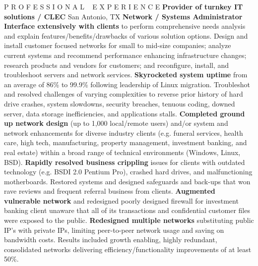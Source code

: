 \begin{rubric}{P R O F E S S I O N A L ~ E X P E R I E N C E}
		\entry*\textbf{Provider of turnkey IT solutions / CLEC} San Antonio, TX
			\textbf{Network / Systems Administrator}
		\entry*\textbf{Interface extensively with clients} to perform comprehensive needs analysis and explain features/benefits/drawbacks of various solution options.  Design and install customer focused networks for small to mid-size companies; analyze current systems and recommend performance enhancing infrastructure changes; research products and vendors for customers; and reconfigure, install, and troubleshoot servers and network services.
		\entry*\textbf{Skyrocketed system uptime} from an average of 86\% to 99.9\% following leadership of Linux migration.  Troubleshot and resolved challenges of varying complexities to reverse prior history of hard drive crashes, system slowdowns, security breaches, tenuous coding, downed server, data storage inefficiencies, and applications stalls.
		\entry*\textbf{Completed ground up network design} (up to 1,000 local/remote users) and/or system and network enhancements for diverse industry clients (e.g. funeral services, health care, high tech, manufacturing, property management, investment banking, and real estate) within a broad range of technical environments (Windows, Linux, BSD).
		\entry*\textbf{Rapidly resolved business crippling} issues for clients with outdated technology (e.g. BSDI 2.0 Pentium Pro), crashed hard drives, and malfunctioning motherboards.  Restored systems and designed safeguards and back-ups that won rave reviews and frequent referral business from clients.
		\entry*\textbf{Augmented vulnerable network} and redesigned poorly designed firewall for investment banking client unaware that all of its transactions and confidential customer files were exposed to the public.
		\entry*\textbf{Redesigned multiple networks} substituting public IP's with private IPs, limiting peer-to-peer network usage and saving on bandwidth costs.  Results included growth enabling, highly redundant, consolidated networks delivering efficiency/functionality improvements of at least 50\%.


\end{rubric}
